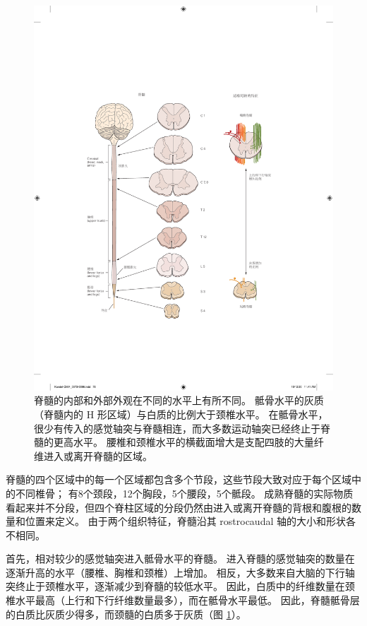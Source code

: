 \begin{figure}[htbp]
	\centering
	\includegraphics[width=1.0\linewidth]{chap04/fig_4_4}
	\caption{脊髓的内部和外部外观在不同的水平上有所不同。 
		骶骨水平的灰质（脊髓内的 H 形区域）与白质的比例大于颈椎水平。 
		在骶骨水平，很少有传入的感觉轴突与脊髓相连，而大多数运动轴突已经终止于脊髓的更高水平。 
		腰椎和颈椎水平的横截面增大是支配四肢的大量纤维进入或离开脊髓的区域。}
	\label{fig:4_4}
\end{figure}


脊髓的四个区域中的每一个区域都包含多个节段，这些节段大致对应于每个区域中的不同椎骨； 有8个颈段，12个胸段，5个腰段，5个骶段。 
成熟脊髓的实际物质看起来并不分段，但四个脊柱区域的分段仍然由进入或离开脊髓的背根和腹根的数量和位置来定义。 
由于两个组织特征，脊髓沿其 rostrocaudal 轴的大小和形状各不相同。


首先，相对较少的感觉轴突进入骶骨水平的脊髓。 进入脊髓的感觉轴突的数量在逐渐升高的水平（腰椎、胸椎和颈椎）上增加。 
相反，大多数来自大脑的下行轴突终止于颈椎水平，逐渐减少到脊髓的较低水平。 
因此，白质中的纤维数量在颈椎水平最高（上行和下行纤维数量最多），而在骶骨水平最低。 
因此，脊髓骶骨层的白质比灰质少得多，而颈髓的白质多于灰质（图 \ref{fig:4_4}）。


